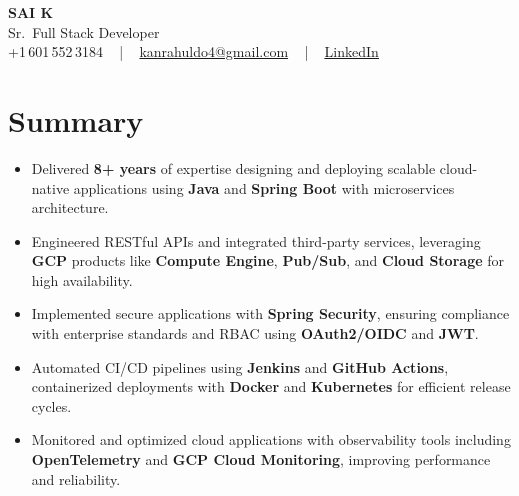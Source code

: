 \documentclass[letterpaper,11pt]{article}
\newcommand{\resumeItem}[1]{
  \item\footnotesize{
    {#1 \vspace{-2pt}}
  }
}
\newcommand{\resumeItemListStart}{\begin{itemize}[leftmargin=*]}
\newcommand{\resumeItemListEnd}{\end{itemize}\vspace{-5pt}}
\begin{document}
\begin{center}
    {\fontsize{14pt}{12pt}\selectfont \textbf{\MakeUppercase{Sai K}}}\\ \vspace{2pt}
    \fontsize{10pt}{12pt}\selectfont Sr.\ Full Stack Developer\\ \vspace{2pt}
    \fontsize{10pt}{12pt}\selectfont +1\,601\,552\,3184 ~ | ~
    \href{mailto:kanrahuldo4@gmail.com}{kanrahuldo4@gmail.com} ~ | ~
    \href{https://www.linkedin.com/in/srrrk/}{\color{blue}\underline{LinkedIn}}
    \vspace{-10pt}
\end{center}

\section{Summary}
\fontsize{9pt}{10pt}\selectfont
\resumeItemListStart
  \resumeItem{Delivered \textbf{8+ years} of expertise designing and deploying scalable cloud-native applications using \textbf{Java} and \textbf{Spring Boot} with microservices architecture.}
  \resumeItem{Engineered RESTful APIs and integrated third-party services, leveraging \textbf{GCP} products like \textbf{Compute Engine}, \textbf{Pub/Sub}, and \textbf{Cloud Storage} for high availability.}
  \resumeItem{Implemented secure applications with \textbf{Spring Security}, ensuring compliance with enterprise standards and RBAC using \textbf{OAuth2/OIDC} and \textbf{JWT}.}
  \resumeItem{Automated CI/CD pipelines using \textbf{Jenkins} and \textbf{GitHub Actions}, containerized deployments with \textbf{Docker} and \textbf{Kubernetes} for efficient release cycles.}
  \resumeItem{Monitored and optimized cloud applications with observability tools including \textbf{OpenTelemetry} and \textbf{GCP Cloud Monitoring}, improving performance and reliability.}
\resumeItemListEnd
\vspace{-6pt}

\end{document}
